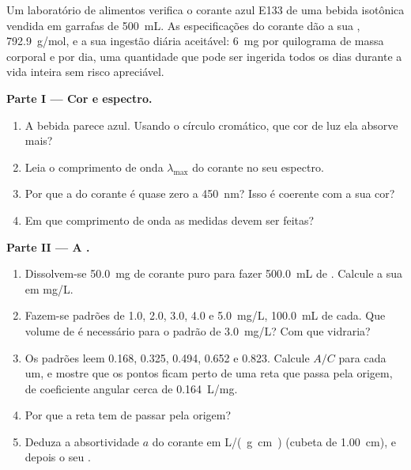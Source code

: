\begin{problem}
\label{pb:g11:absorbance:1}
Um laboratório de alimentos verifica o corante azul E133 de uma bebida
isotônica vendida em garrafas de \qty{500}{mL}. As especificações do
corante dão a sua , \qty{792.9}{g/mol}, e a sua ingestão
diária aceitável: \qty{6}{mg} por quilograma de massa corporal e por
dia, uma quantidade que pode ser ingerida todos os dias durante a vida
inteira sem risco apreciável.

\medskip
\noindent\textbf{Parte I --- Cor e espectro.}
\begin{enumerate}
  \item A bebida parece azul. Usando o círculo cromático, que cor de luz
        ela absorve mais?
  \item Leia o comprimento de onda $\lambda_{\max}$ do corante no seu
        espectro.
  \item Por que a  do corante é quase zero a \qty{450}{nm}?
        Isso é coerente com a sua cor?
  \item Em que comprimento de onda as medidas devem ser feitas?
\end{enumerate}

\medskip
\noindent\textbf{Parte II --- A .}
\begin{enumerate}[resume]
  \item Dissolvem-se \qty{50.0}{mg} de corante puro para fazer
        \qty{500.0}{mL} de . Calcule a sua  em \si{mg/L}.
  \item Fazem-se padrões de 1.0, 2.0, 3.0, 4.0 e \qty{5.0}{mg/L},
        \qty{100.0}{mL} de cada. Que volume de  é
        necessário para o padrão de \qty{3.0}{mg/L}? Com que vidraria?
  \item Os padrões leem 0.168, 0.325, 0.494, 0.652 e 0.823. Calcule
        $A / C$ para cada um, e mostre que os pontos ficam perto de uma
        reta que passa pela origem, de coeficiente angular cerca de
        \qty{0.164}{L/mg}.
  \item Por que a reta tem de passar pela origem?
  \item Deduza a absortividade $a$ do corante em \si{L/(g.cm)} (cubeta
        de \qty{1.00}{cm}), e depois o seu .
\end{enumerate}


\end{problem}
